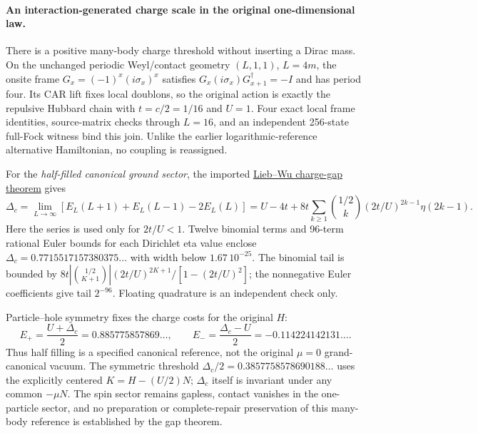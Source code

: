 \paragraph{An interaction-generated charge scale in the original one-dimensional law.}
There is a positive many-body charge threshold without inserting a Dirac
mass.  On the unchanged periodic Weyl/contact geometry $(L,1,1)$,
$L=4m$, the onsite frame $G_x=(-1)^x(i\sigma_x)^x$ satisfies
$G_x(i\sigma_x)G_{x+1}^\dagger=-I$ and has period four.  Its CAR lift
fixes local doublons, so the original action is exactly the repulsive
Hubbard chain with $t=c/2=1/16$ and $U=1$.  Four exact local frame
identities, source-matrix checks through $L=16$, and an independent
256-state full-Fock witness bind this join.  Unlike the earlier
logarithmic-reference alternative Hamiltonian, no coupling is reassigned.

For the \emph{half-filled canonical ground sector}, the imported
\href{https://arxiv.org/html/cond-mat/0207529}{Lieb--Wu charge-gap theorem}
gives
\[
 \Delta_c=\lim_{L\to\infty}
 [E_L(L+1)+E_L(L-1)-2E_L(L)]
 =U-4t+8t\sum_{k\ge1}{1/2\choose k}
       (2t/U)^{2k-1}\eta(2k-1).
\]
Here the series is used only for $2t/U<1$.  Twelve binomial terms and
96-term rational Euler bounds for each Dirichlet eta value enclose
$\Delta_c=0.7715517157380375\ldots$ with width below $1.67\,10^{-25}$.
The binomial tail is bounded by
$8t|{1/2\choose K+1}|(2t/U)^{2K+1}/[1-(2t/U)^2]$;
the nonnegative Euler coefficients give tail $2^{-96}$.
Floating quadrature is an independent check only.

Particle--hole symmetry fixes the charge costs for the original $H$:
\[
 E_+=\frac{U+\Delta_c}{2}=0.885775857869\ldots,\qquad
 E_-=\frac{\Delta_c-U}{2}=-0.114224142131\ldots .
\]
Thus half filling is a specified canonical reference, not the original
$\mu=0$ grand-canonical vacuum.  The symmetric threshold
$\Delta_c/2=0.3857758578690188\ldots$ uses the explicitly centered
$K=H-(U/2)N$; $\Delta_c$ itself is invariant under any common $-\mu N$.
The spin sector remains gapless, contact vanishes in the
one-particle sector, and no preparation or complete-repair preservation
of this many-body reference is established by the gap theorem.

